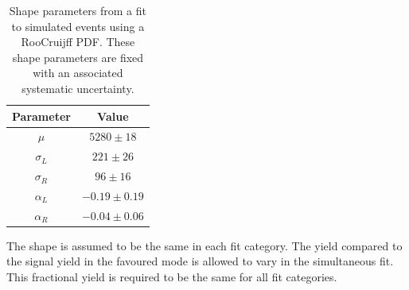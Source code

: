 \begin{table}[h]
\centering
\begin{tabular}{cc}
\hline
Parameter & Value \\
\hline
$\mu$ & $5280 \pm 18$ \\
$\sigma_L$ & $221 \pm 26$ \\
$\sigma_R$ & $96 \pm 16$ \\
$\alpha_L$ & $-0.19 \pm 0.19$ \\
$\alpha_R$ & $-0.04 \pm 0.06$ \\
\hline
\end{tabular}
\caption{Shape parameters from a fit to simulated \decay{\Lb}{\Lc\Km} events using a RooCruijff PDF. These shape parameters are fixed with an associated systematic uncertainty.}
\label{fitresultsLb}
\end{table}

The shape is assumed to be the same in each \kk fit category. The  yield compared to the signal yield in the favoured \kpi mode is allowed to vary in the simultaneous fit. This fractional yield is required to be the same for all fit categories. 

